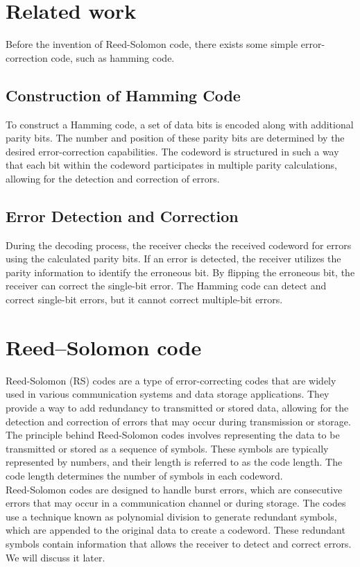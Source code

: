 \documentclass[12pt]{article}
\begin{document}
\section{Related work}
Before the invention of Reed-Solomon code, there exists some simple error-correction code, such as hamming code.\cite{hamming1950error}
\subsection{Construction of Hamming Code}
To construct a Hamming code, a set of data bits is encoded along with additional parity bits. The number and position of these parity bits are determined by the desired error-correction capabilities. The codeword is structured in such a way that each bit within the codeword participates in multiple parity calculations, allowing for the detection and correction of errors.
\subsection{Error Detection and Correction}
During the decoding process, the receiver checks the received codeword for errors using the calculated parity bits. If an error is detected, the receiver utilizes the parity information to identify the erroneous bit. By flipping the erroneous bit, the receiver can correct the single-bit error. The Hamming code can detect and correct single-bit errors, but it cannot correct multiple-bit errors.

\section{Reed–Solomon code}
Reed-Solomon (RS) codes are a type of error-correcting codes that are widely used in various communication systems and data storage applications. They provide a way to add redundancy to transmitted or stored data, allowing for the detection and correction of errors that may occur during transmission or storage.\\
The principle behind Reed-Solomon codes involves representing the data to be transmitted or stored as a sequence of symbols. These symbols are typically represented by numbers, and their length is referred to as the code length. The code length determines the number of symbols in each codeword.\\
Reed-Solomon codes are designed to handle burst errors, which are consecutive errors that may occur in a communication channel or during storage. The codes use a technique known as polynomial division to generate redundant symbols, which are appended to the original data to create a codeword. These redundant symbols contain information that allows the receiver to detect and correct errors. We will discuss it later.
\end{document}
